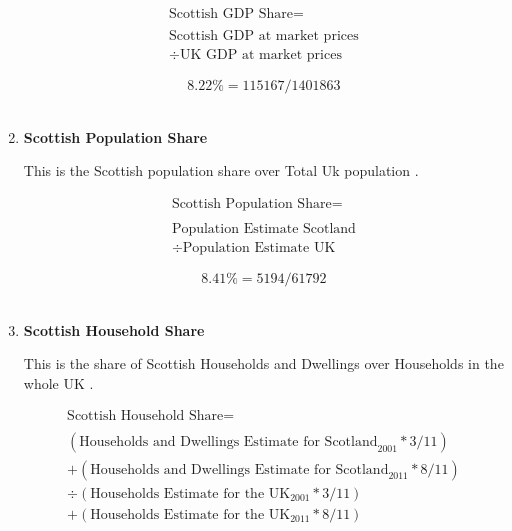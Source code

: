 \begin{enumerate}
\begin{equation}
\begin{split}
\text{Scottish GDP Share} =  \\ \\
\text{Scottish GDP at market prices}\\ 
\div \text{UK GDP at market prices} 
\end{split} \label{eq:2.5.85}
\end{equation}

\begin{equation} \nonumber
8.22\% = 115167/1401863
\end{equation}\\


\item \textbf {Scottish Population Share}

This is the Scottish population share over Total Uk population \cite{ONS2011a}.

\begin{equation}
\begin{split}
\text{Scottish Population Share} =  \\ \\
\text{Population Estimate Scotland}\\ 
\div \text{Population Estimate UK} 
\end{split} \label{eq:2.5.86}
\end{equation}

\begin{equation} \nonumber
8.41\% = 5194/61792
\end{equation}\\


\item \textbf {Scottish Household Share}

This is the share of Scottish Households and Dwellings over Households in the whole UK \cite{ONS2012}.

\begin{equation}
\begin{split}
\text{Scottish Household Share} =  \\ \\
(\text{Households and Dwellings Estimate for Scotland}_\text{2001}*3/11)\\
+(\text{Households and Dwellings Estimate for Scotland}_\text{2011}*8/11)\\ 
\div (\text{Households Estimate for the UK}_\text{2001}*3/11)\\
+(\text{Households Estimate for the UK}_\text{2011}*8/11)\\ 
\end{split} \label{eq:2.5.87}
\end{equation}


\end{enumerate}
